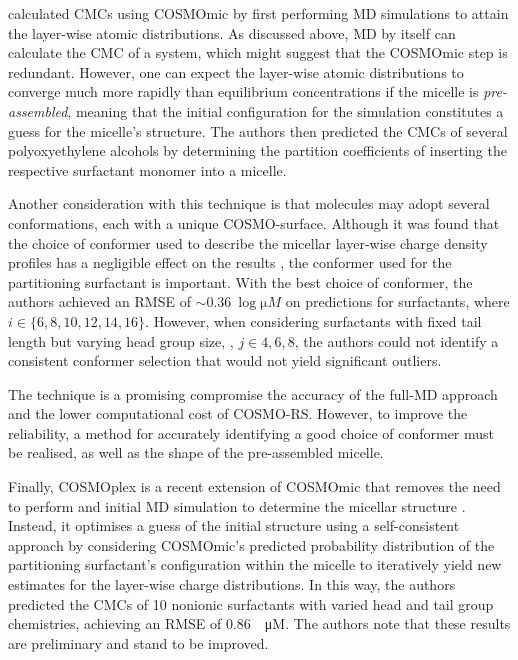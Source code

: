 \citet{jakobtorweihenPredictingCriticalMicelle2017} calculated CMCs using
COSMOmic by first performing MD simulations to attain the layer-wise atomic
distributions. As discussed above, MD by itself can calculate the CMC of a
system, which might suggest that the COSMOmic step is redundant. However, one
can expect the layer-wise atomic distributions to converge much more rapidly
than equilibrium concentrations if the micelle is \emph{pre-assembled}, meaning
that the initial configuration for the simulation constitutes a guess for the
micelle's structure. The authors then predicted the CMCs of several
polyoxyethylene alcohols by determining the partition coefficients of inserting
the respective surfactant monomer into a micelle.

Another consideration with this technique is that molecules may adopt several
conformations, each with a unique COSMO-surface. Although it was found that the
choice of conformer used to describe the micellar layer-wise charge density
profiles has a negligible effect on the results
\cite{jakobtorweihenCombinationCOSMOmicMolecular2013}, the conformer used for
the partitioning surfactant is important. With the best choice of conformer, the
authors achieved an RMSE of $\sim \SI{0.36}{\log \micro M}$ on predictions for
 surfactants, where $i \in \{6, 8, 10, 12, 14, 16\}$. However, when
considering surfactants with fixed tail length but varying head group size,
, $j \in {4, 6, 8}$, the authors could not identify a consistent
conformer selection that would not yield significant outliers.

The technique is a promising compromise the accuracy of the full-MD approach
and the lower computational cost of COSMO-RS. However, to improve the reliability,
a method for accurately identifying a good choice of conformer must be realised,
as well as the shape of the pre-assembled micelle.

Finally, COSMOplex is a recent extension of COSMOmic that removes the need to
perform and initial MD simulation to determine the micellar structure
\cite{klamtCOSMOplexSelfconsistentSimulation2019}. Instead, it optimises a guess
of the initial structure using a self-consistent approach by considering
COSMOmic's predicted probability distribution of the partitioning surfactant's
configuration within the micelle to iteratively yield new estimates for the
layer-wise charge distributions. In this way, the authors predicted the CMCs of
10 nonionic surfactants with varied head and tail group chemistries, achieving
an RMSE of \SI{0.86}{\log \micro M}. The authors note that these results are
preliminary and stand to be improved.

